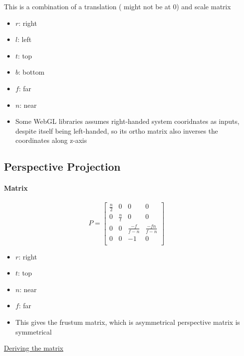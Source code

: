     This is a combination of a translation ( might not be at 0)
    and scale matrix

    \begin{itemize}
      \item $ r $: right
      \item $ l $: left
      \item $ t $: top
      \item $ b $: bottom
      \item $ f $: far
      \item $ n $: near
      \item Some WebGL libraries assumes right-handed system cooridnates as
      inputs, despite itself being left-handed, so its ortho matrix also
      inverses the coordinates along z-axis
    \end{itemize}

  \subsection{Perspective Projection}

    \paragraph{Matrix}
    \begin{equation}
      P =
      \begin{bmatrix}
        \frac{n}{2} & 0 & 0 & 0 \\
        0 & \frac{n}{t} & 0 & 0 \\
        0 & 0 & \frac{-f}{f - n} & \frac{-fn}{f - n} \\
        0 & 0 & -1 & 0 \\
      \end{bmatrix}
    \end{equation}

    \begin{itemize}
      \item $ r $: right
      \item $ t $: top
      \item $ n $: near
      \item $ f $: far
      \item This gives the frustum matrix, which is asymmetrical
      perspective matrix is symmetrical
    \end{itemize}

    \href{http://www.songho.ca/opengl/gl_projectionmatrix.html}{Deriving
    the matrix}


